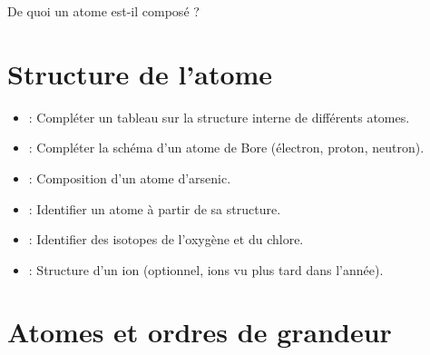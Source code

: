 \documentclass[12pt,a4paper]{article}
\date{}
\title{}
\begin{document}
	
	


\begin{mypb}
	\begin{center}
		{\Large De quoi un atome est-il composé ?}
	\end{center}
\end{mypb}



\section{Structure de l'atome}








\begin{myexos}
	\begin{itemize}
		\item {} : Compléter un tableau sur la structure interne de différents atomes.
		\item {} : Compléter la schéma d'un atome de Bore (électron, proton, neutron).
		\item {} : Composition d'un atome d'arsenic.
		\item {} : Identifier un atome à partir de sa structure.
		\item {} : Identifier des isotopes de l'oxygène et du chlore.
		\item {} : Structure d'un ion (optionnel, ions vu plus tard dans l'année).
	\end{itemize}
\end{myexos}

\section{Atomes et ordres de grandeur}




\end{document}
